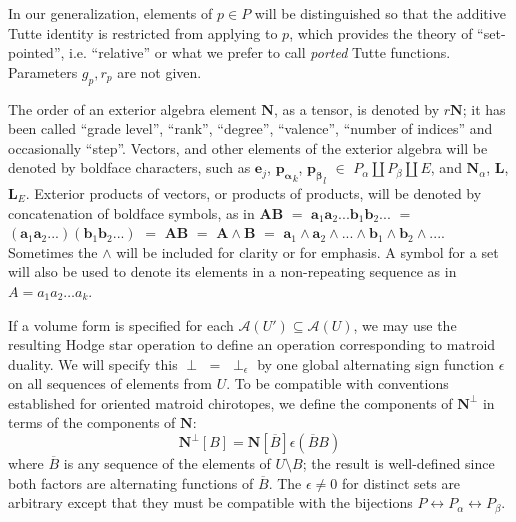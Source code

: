 \documentclass[Unicode]{cedram-alco}
\newcommand{\ext}[1]{\ensuremath{\mathbf{#1}}}
\newcommand{\dunion}{\coprod}
\begin{document}
In our generalization, elements of $p\in P$ will be distinguished
so that the additive Tutte identity is restricted from applying
to $p$, which provides the theory of ``set-pointed''\cite{SetPointedLV},
i.e. ``relative''\cite{RelTuttePolyDiaoHetyei} or what we
prefer to call \emph{ported}\cite{sdcPorted,TutteEx}
Tutte functions.  Parameters $g_p, r_p$ are not given.


The order of an exterior algebra element $\ext{N}$, as a tensor,
is denoted by $r\ext{N}$; it has been 
called ``grade level'', ``rank'', ``degree'',
``valence'', ``number of indices''
and occasionally\cite{RotaCayley} ``step''.
Vectors, and other elements of the
exterior algebra will be denoted by boldface
characters, such as $\ext{e}_j$, $\ext{p_\alpha}_k$,
$\ext{p_\beta}_l$ $\in$ $P_\alpha \dunion P_\beta \dunion E$,
and $\ext{N}_\alpha$, $\ext{L}$, $\ext{L}_E$.  Exterior products
of vectors, or products of products, will be denoted by
concatenation of boldface symbols, as in $\ext{AB}$
 $=$ $\ext{a}_1\ext{a}_2...\ext{b}_1\ext{b}_2...$ $=$
$(\ext{a}_1\ext{a}_2...)(\ext{b}_1\ext{b}_2...)$ $=$
$\ext{A}\ext{B}$ $=$ $\ext{A}\wedge\ext{B}$ $=$ 
$\ext{a}_1\wedge\ext{a}_2\wedge...\wedge\ext{b}_1\wedge\ext{b}_2\wedge...$.
Sometimes the $\wedge$ will be included for clarity or for emphasis.
A symbol for a set will also be used to denote its elements
in a non-repeating sequence as in $A=a_1a_2\ldots a_k$.



If a volume form is specified for each $\mathcal{A}(U')\subseteq\mathcal{A}(U)$,
we may use the resulting Hodge star operation to define an operation
corresponding to matroid duality.  We will specify this
$\perp$ $=$ $\perp_\epsilon$ by one global
alternating sign function $\epsilon$  on all sequences of
elements from $U$.  To be compatible with conventions established
for oriented matroid chirotopes\cite{OMBOOK}, we define 
the components of $\ext{N}^\perp$ in terms of the
components of $\ext{N}$:
\begin{equation}\label{dualdefinition}
  \ext{N}^\perp[B] = \ext{N}[\overline{B}]\epsilon(\overline{B}B)
\end{equation}
where $\overline{B}$ is any sequence of the elements of $U\setminus B$;
the result is well-defined since both factors are alternating
functions of $\overline{B}$.  The $\epsilon\neq 0$ for distinct sets
are arbitrary except that they must be compatible with
the bijections
$P \leftrightarrow P_{\alpha}\leftrightarrow P_{\beta}$.
\end{document}
